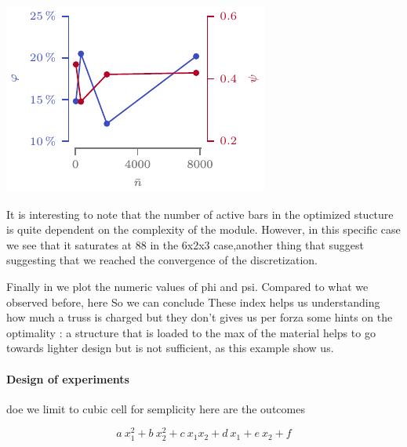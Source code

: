 \begin{marginfigure}
    \centering
    \includegraphics[width=\linewidth]{figures/05_cellular_opt/00_module_complexity_tab/comp_tab_param.pdf}
    \caption{}
    \label{fig:05_comp_param}
\end{marginfigure}

It is interesting to note that the number of active bars in the optimized stucture is quite dependent on the complexity of the module. However, in this specific case we see that it saturates at 88 in the 6x2x3 case,another thing that suggest suggesting that we reached the convergence of the discretization.

Finally in  we plot the numeric values of phi and psi. Compared to what we observed before, here So we can conclude These index helps us understanding how much a truss is charged but they don't gives us per forza some hints on the optimality : a structure that is loaded to the max of the material helps to go towards lighter design but is not sufficient, as this example show us.

\paragraph{Design of experiments}
\gls{doe}
we limit to cubic cell for semplicity
here are the outcomes

\begin{equation}
    a\:x_1^2+b\:x_2^2+c\:x_1x_2+d\:x_1+e\:x_2+f
\end{equation}

